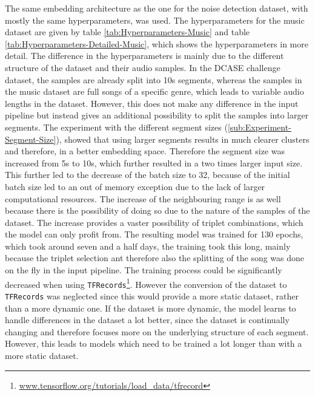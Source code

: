 The same embedding architecture as the one for the noise detection dataset, with mostly the same hyperparameters, was used. The hyperparameters for the music dataset are given by table \ref{tab:Hyperparameters-Music} and table \ref{tab:Hyperparameters-Detailed-Music}, which shows the hyperparameters in more detail. The difference in the hyperparameters is mainly due to the different structure of the dataset and their audio samples. In the \gls{DCASE} challenge dataset, the samples are already split into 10s segments, whereas the samples in the music dataset are full songs of a specific genre, which leads to variable audio lengths in the dataset. However, this does not make any difference in the input pipeline but instead gives an additional possibility to split the samples into larger segments. The experiment with the different segment sizes (\ref{sub:Experiment-Segment-Size}), showed that using larger segments results in much clearer clusters and therefore, in a better embedding space. Therefore the segment size was increased from 5s to 10s, which further resulted in a two times larger input size. This further led to the decrease of the batch size to 32, because of the initial batch size led to an out of memory exception due to the lack of larger computational resources. The increase of the neighbouring range is as well because there is the possibility of doing so due to the nature of the samples of the dataset. The increase provides a vaster possibility of triplet combinations, which the model can only profit from.
\newline
\newline
The resulting model was trained for 130 epochs, which took around seven and a half days, the training took this long, mainly because the triplet selection ant therefore also the splitting of the song was done on the fly in the input pipeline. The training process could be significantly decreased when using \texttt{TFRecords}\footnote{\href{https://www.tensorflow.org/tutorials/load\_data/tfrecord\#tfrecord\_files\_using\_tfdata}{www.tensorflow.org/tutorials/load\_data/tfrecord}}. However the conversion of the dataset to \texttt{TFRecords} was neglected since this would provide a more static dataset, rather than a more dynamic one. If the dataset is more dynamic, the model learns to handle differences in the dataset a lot better, since the dataset is continually changing and therefore focuses more on the underlying structure of each segment. However, this leads to models which need to be trained a lot longer than with a more static dataset.
\newline
